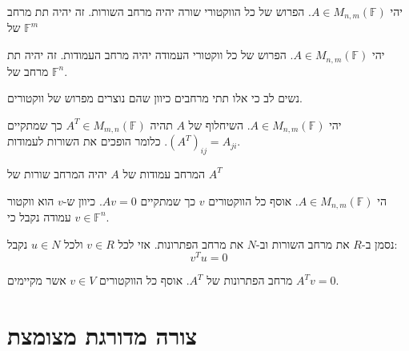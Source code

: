 \documentclass{tstextbook}
\begin{document}
\begin{definition}
יהי \(A \in M_{n,m}\left( \mathbb{F}  \right)\). הפרוש של כל הווקטורי שורה יהיה מרחב השורות. זה יהיה תת מרחב של \(\mathbb{F} ^{m}\)

\end{definition}
\begin{definition}
יהי \(A \in M_{n,m}\left( \mathbb{F}  \right)\). הפרוש של כל ווקטורי העמודה יהיה מרחב העמודות. זה יהיה תת מרחב של \(\mathbb{F} ^{n}\).

\end{definition}
\begin{remark}
נשים לב כי אלו תתי מרחבים כיוון שהם נוצרים מפרוש של ווקטורים. 

\end{remark}
\begin{definition}
יהי \(A \in M_{n,m}\left( \mathbb{F}  \right)\). השיחלוף של \(A\) תהיה \(A^{T}\in M_{m,n}\left( \mathbb{F}  \right)\) כך שמתקיים \((A^{T})_{ij}=A_{ji}\). כלומר הופכים את השורות לעמודות.

\end{definition}
\begin{proposition}
המרחב עמודות של \(A\) יהיה המרחב שורות של \(A^{T}\)

\end{proposition}
\begin{definition}
הי \(A \in M_{n,m}\left( \mathbb{F}  \right)\). אוסף כל הווקטורים \(v\) כך שמתקיים \(Av=0\). כיוון ש-\(v\) הוא ווקטור עמודה נקבל כי \(v\in \mathbb{F} ^{n}\).

\end{definition}
\begin{proposition}
נסמן ב-\(R\) את מרחב השורות וב-\(N\) את מרחב הפתרונות. אזי לכל \(v \in R\) ולכל \(u \in N\) נקבל:
$$v^{T}u=0$$

\end{proposition}
\begin{definition}
מרחב הפתרונות של \(A^{T}\). אוסף כל הווקטורים \(v \in V\) אשר מקיימים \(A^{T}v=0\).

\end{definition}

\section{צורה מדורגת מצומצת}
\end{document}
